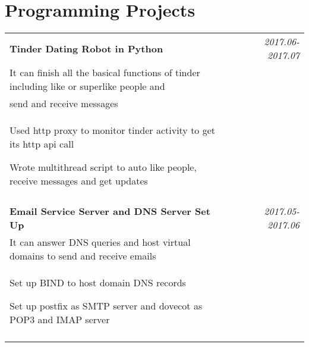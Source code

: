 \documentclass[a4paper,10pt]{article}
\begin{document}
\section{Programming Projects}
\begin{tabular}{p{13.5cm}p{0.5cm}r}

\textbf{Tinder Dating Robot in Python} && \emph{2017.06-2017.07} \\
\hspace{1em} It can finish all the basical functions of tinder including like or superlike people and && \vspace{-0.5em}\\
\hspace{1em} send and receive messages && \vspace{-0.5em} \\
\begin{compactitem}
  \item Used http proxy to monitor tinder activity to get its http api call\vspace{0.2em}
  \item Wrote multithread script to auto like people, receive messages and get updates\vspace{0.2em}
\end{compactitem}&&\vspace{-2.2em} \\
\multicolumn{3}{c}{} \\


\textbf{Email Service Server and DNS Server Set Up} && \emph{2017.05-2017.06} \\
\hspace{1em} It can answer DNS queries and host virtual domains to send and receive emails && \vspace{-0.5em} \\
\begin{compactitem}
  \item Set up BIND to host domain DNS records \vspace{0.2em}
  \item Set up postfix as SMTP server and dovecot as POP3 and IMAP server \vspace{0.2em}  
\end{compactitem}&&\vspace{-2.2em} \\
\multicolumn{3}{c}{} \\



\end{tabular}
\end{document}
